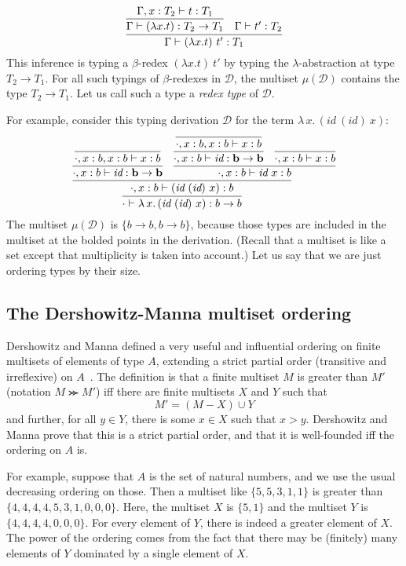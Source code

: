 \documentclass{article}
\begin{document}
\[ 
\infer{\Gamma \vdash (\lambda x.t)\ t' : T_1}
       {\infer{\Gamma \vdash (\lambda x.t) : T_2\to T_1}
              {\Gamma, x : T_2 \vdash t : T_1} & \Gamma \vdash t' : T_2}
\]
\noindent This inference is typing a $\beta$-redex $(\lambda x.t)\ t'$ by
typing the $\lambda$-abstraction at type $T_2\to T_1$.  For all such
typings of $\beta$-redexes in $\mathcal{D}$, the multiset $\mu(\mathcal{D})$
contains the type $T_2 \to T_1$.  Let us call such a type a \emph{redex type}
of $\mathcal{D}$.

For example, consider this typing derivation $\mathcal{D}$ for the term $\lambda\,x.\,(\textit{id}\ (\textit{id})\ x)$:
\[
\infer{\cdot\vdash \lambda\,x.\,(\textit{id}\ (\textit{id})\ x) : b \to b}
      {\infer{\cdot, x : b \vdash (\textit{id}\ (\textit{id})\ x) : b}
        {\infer{\cdot, x : b \vdash \textit{id} : \mathbf{b \to b}}{\infer{\cdot, x : b , x : b \vdash x : b}{\ }} &
          \infer{\cdot , x : b \vdash \textit{id}\ x : b}
                {\infer{\cdot, x : b \vdash \textit{id} : \mathbf{b \to b}}{\infer{\cdot, x : b , x : b \vdash x : b}{\ }} &
                  \infer{\cdot, x : b \vdash x : b}{\ }}}}
\]
\noindent The multiset $\mu(\mathcal{D})$ is $\{ b \to b, b \to b \}$,
because those types are included in the multiset at the bolded points
in the derivation.  (Recall that a multiset is like a set except that multiplicity
is taken into account.)  Let us say that we are just ordering types by their
size.

\subsection{The Dershowitz-Manna multiset ordering}

Dershowitz and Manna defined a very useful and influential ordering on finite multisets of elements of type $A$, extending
a strict partial order (transitive and irreflexive) on $A$~\cite{dm79}.  The definition is that a finite multiset $M$ is
greater than $M'$ (notation $M \ggcurly M'$) iff there are finite multisets $X$ and $Y$ such that
\[
M' = (M - X) \cup Y
\]
\noindent and further, for all $y\in Y$, there is some $x \in X$ such that $x > y$.  Dershowitz and Manna prove that this
is a strict partial order, and that it is well-founded iff the ordering on $A$ is.

For example, suppose that $A$ is the set of natural numbers, and we use the usual decreasing ordering on those.  Then
a multiset like $\{ 5, 5, 3 , 1 , 1 \}$ is greater than $\{ 4 , 4 , 4 , 4 , 5 , 3 , 1 , 0 , 0 , 0 \}$.  Here, the
multiset $X$ is $\{ 5, 1 \}$ and the multiset $Y$ is $\{ 4 , 4 , 4 , 4 , 0 , 0 , 0 \}$.  For every element of $Y$,
there is indeed a greater element of $X$.  The power of the ordering comes from the fact that there may be (finitely) many
elements of $Y$ dominated by a single element of $X$.  
\end{document}
